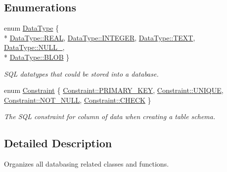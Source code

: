 \subsection*{Enumerations}
\begin{DoxyCompactItemize}
\item 
enum \hyperlink{namespacedatabase_a596cea80c57ec5a9b3b4018f733a43fd}{Data\+Type} \{ \\*
\hyperlink{namespacedatabase_a596cea80c57ec5a9b3b4018f733a43fda8cf125b0e31559ba75a9d9b4f818a554}{Data\+Type\+::\+R\+E\+AL}, 
\hyperlink{namespacedatabase_a596cea80c57ec5a9b3b4018f733a43fda5d5cd46919fa987731fb2edefe0f2a0c}{Data\+Type\+::\+I\+N\+T\+E\+G\+ER}, 
\hyperlink{namespacedatabase_a596cea80c57ec5a9b3b4018f733a43fda61a96ffcb251bb9bf0abf8fec19d0ea8}{Data\+Type\+::\+T\+E\+XT}, 
\hyperlink{namespacedatabase_a596cea80c57ec5a9b3b4018f733a43fda6d67bdfe4ae19f38aff8f363bca42892}{Data\+Type\+::\+N\+U\+L\+L\+\_\+}, 
\\*
\hyperlink{namespacedatabase_a596cea80c57ec5a9b3b4018f733a43fda1649cff06611a6025da3dd511a97fb43}{Data\+Type\+::\+B\+L\+OB}
 \}\begin{DoxyCompactList}\small\item\em S\+QL datatypes that could be stored into a database. \end{DoxyCompactList}
\item 
enum \hyperlink{namespacedatabase_a77defe1118948f64f1e32f4b78c04f5b}{Constraint} \{ \hyperlink{namespacedatabase_a77defe1118948f64f1e32f4b78c04f5ba5e0276ef8ae59ebb9aae19348ad173d5}{Constraint\+::\+P\+R\+I\+M\+A\+R\+Y\+\_\+\+K\+EY}, 
\hyperlink{namespacedatabase_a77defe1118948f64f1e32f4b78c04f5ba88e3e8040c7cd11b9faffdf34372fa2a}{Constraint\+::\+U\+N\+I\+Q\+UE}, 
\hyperlink{namespacedatabase_a77defe1118948f64f1e32f4b78c04f5baeed1de8e53bda49dda97e42841cfe6c5}{Constraint\+::\+N\+O\+T\+\_\+\+N\+U\+LL}, 
\hyperlink{namespacedatabase_a77defe1118948f64f1e32f4b78c04f5ba8c46d8d9d3402788403e2f6911153089}{Constraint\+::\+C\+H\+E\+CK}
 \}\begin{DoxyCompactList}\small\item\em The S\+QL constraint for column of data when creating a table schema. \end{DoxyCompactList}
\end{DoxyCompactItemize}


\subsection{Detailed Description}
Organizes all databasing related classes and functions. 

